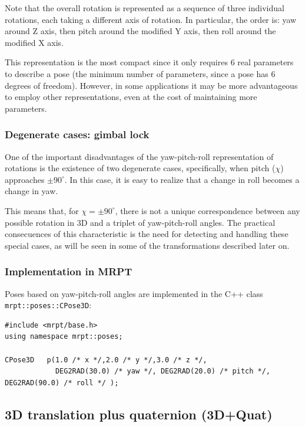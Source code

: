 \documentclass[a4paper,11pt]{report}
\begin{document}
Note that the overall rotation is represented as a sequence of three individual rotations, 
each taking a different axis of rotation. 
In particular, the order is: yaw around Z axis, then pitch around the modified Y axis, 
then roll around the modified X axis.

This representation is the most compact since it only requires 6 real parameters
to describe a pose (the minimum number of parameters, since a pose has 6 degrees of freedom).
However, in some applications it may be more advantageous to employ other representations, 
even at the cost of maintaining more parameters.


\subsubsection{Degenerate cases: gimbal lock}
\label{sect:ypr:gimbal}

One of the important disadvantages of the yaw-pitch-roll representation of rotations is the existence 
of two degenerate cases, specifically, when pitch ($\chi$) approaches $\pm 90^\circ$. In this case, 
it is easy to realize that a change in roll becomes a change in yaw.

This means that, for $ \chi = \pm 90^\circ$, there is not a unique correspondence between any possible
rotation in 3D and a triplet of yaw-pitch-roll angles. 
The practical consecuences of this characteristic is the need for detecting and handling these 
special cases, as will be seen in some of the transformations described later on.


\subsubsection{Implementation in MRPT}

Poses based on yaw-pitch-roll angles are implemented in the C++ class \texttt{mrpt::poses::CPose3D}:

\begin{lstlisting}
#include <mrpt/base.h> 
using namespace mrpt::poses; 

CPose3D   p(1.0 /* x */,2.0 /* y */,3.0 /* z */, 
            DEG2RAD(30.0) /* yaw */, DEG2RAD(20.0) /* pitch */, DEG2RAD(90.0) /* roll */ );
\end{lstlisting}



\subsection{3D translation plus quaternion (3D+Quat)}
\end{document}
